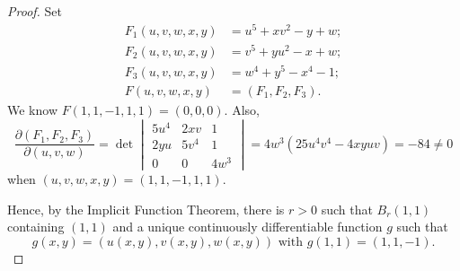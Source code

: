 \begin{Exercise}
\begin{proof}
Set
\begin{align*}
F_1(u,v,w,x,y) &= u^5+x v^2-y+w; \\
F_2(u,v,w,x,y) &= v^5+y u^2-x+w; \\
F_3(u,v,w,x,y) &= w^4+y^5-x^4-1; \\
F(u,v,w,x,y) &= (F_1,F_2,F_3).
\end{align*}
We know $F(1,1,-1,1,1) = (0,0,0)$. Also,
$$
\frac{\partial(F_1,F_2,F_3)}{\partial(u,v,w)} = \det\begin{vmatrix}
5u^4 & 2x v & 1 \\
2y u & 5v^4 & 1 \\
0 & 0 & 4w^3
\end{vmatrix}
= 4w^3(25u^4v^4-4x y u v)
= -84
\neq 0
$$
when $(u,v,w,x,y)=(1,1,-1,1,1)$.

Hence, by the Implicit Function Theorem, there is $r>0$ such that $B_r(1,1)$ containing $(1,1)$ and a unique continuously differentiable function $g$ such that 
$$
g(x,y) = (u(x,y), v(x,y), w(x,y))\text{ with }g(1,1) = (1,1,-1).
$$
\end{proof}
\end{Exercise}